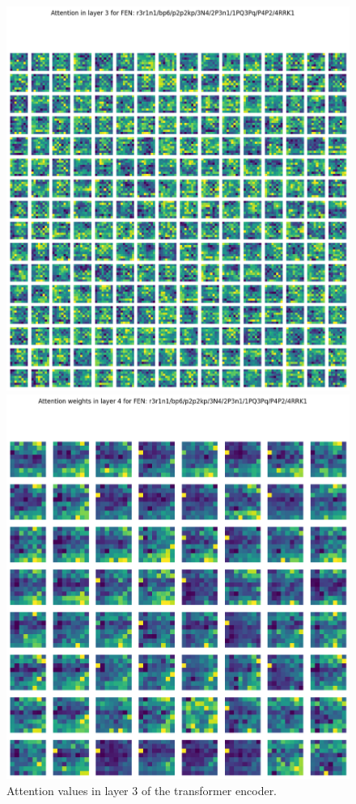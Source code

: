 \begin{figure}[H]
  \begin{minipage}{0.475\textwidth}
    \centering
    \includegraphics[width=\textwidth]{project/img/attention_maps/attention_3.png}
    \caption{Attention values in layer 3 of the transformer encoder.}
    \label{atnP}
  \end{minipage}
  \hspace{0.05\textwidth}
  \begin{minipage}{0.475\textwidth}
    \centering
    \includegraphics[width=\textwidth]{project/img/attention_maps/weights_4.png}

\end{minipage}
\end{figure}
